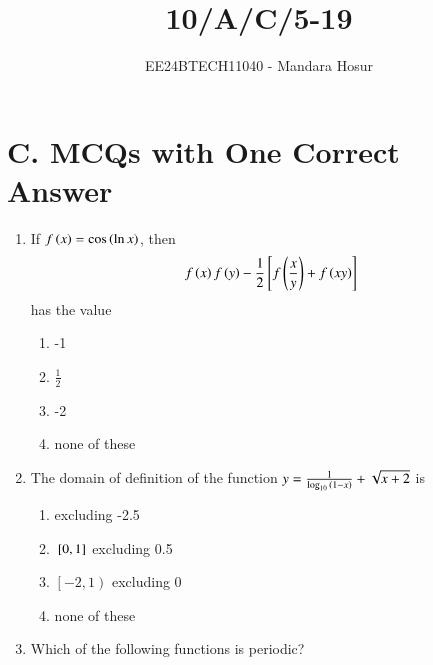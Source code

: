 \documentclass[journal,12pt,twocolumn]{IEEEtran}
\theoremstyle{remark}
\begin{document}

\vspace{3cm}

\title{10/A/C/5-19}
\author{EE24BTECH11040 - Mandara Hosur}
\maketitle
\newpage
\bigskip

\renewcommand{\thefigure}{\theenumi}
\renewcommand{\thetable}{\theenumi}

\section*{\textbf{C. MCQs with One Correct Answer}}

\begin{enumerate}

\item If $f\left(x\right) = \cos{\ensuremath{\left(\ln{x}\right)}}$, then $$f\left(x\right)f\left(y\right)-\frac{1}{2} {}\left[f\left(\frac{x}{y}\right)+f\left(xy\right)\right]$$ has the value

\hfill{}

\begin{multicols}{2}
	\begin{enumerate}
		\item -1 
		\item $\frac{1}{2}$
		\item -2 
		\item none of these
	\end{enumerate}
\end{multicols}

\item The domain of definition of the function
$y = \frac{1}{\log_{10}{\left(1-x\right)}} + \sqrt{x+2}$ is

\hfill{}

\begin{multicols}{2}
	\begin{enumerate}
		\item {} excluding -2.5 
		\item ${}\left[0, 1\right]$ excluding 0.5
		\item $\left[-2, 1\right)$ excluding 0 
		\item none of these
	\end{enumerate}
\end{multicols}

\item Which of the following functions is periodic?


\end{enumerate}
\end{document}
